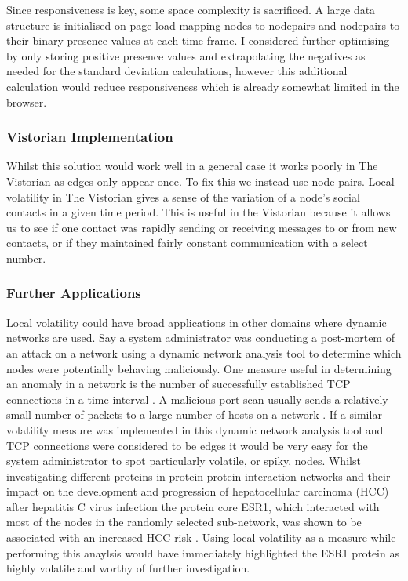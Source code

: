 Since responsiveness is key, some space complexity is sacrificed. A large data structure is initialised on page load mapping nodes to nodepairs and nodepairs to their binary presence values at each time frame.
I considered further optimising by only storing positive presence values and extrapolating the negatives as needed for the standard deviation calculations, however this additional calculation would reduce responsiveness which is already somewhat limited in the browser.

\subsubsection*{Vistorian Implementation}
Whilst this solution would work well in a general case it works poorly in The Vistorian as edges only appear once. To fix this we instead use node-pairs. 
Local volatility in The Vistorian gives a sense of the variation of a node's social contacts in a given time period. This is useful in the Vistorian because it allows us to see if one contact was rapidly sending or receiving messages to or from new contacts, or if they maintained fairly constant communication with a select number. 


\subsubsection*{Further Applications}
Local volatility could have broad applications in other domains where dynamic networks are used. 
\newline\newline
Say a system administrator was conducting a post-mortem of an attack on a network using a dynamic network analysis tool to determine which nodes were potentially behaving maliciously. One measure useful in determining an anomaly in a network is the number of successfully established TCP connections in a time interval \cite{fnpfid}. A malicious port scan usually sends a relatively small number of packets to a large number of hosts on a network \cite{fnpfid}. If a similar volatility measure was implemented in this dynamic network analysis tool and TCP connections were considered to be edges it would be very easy for the system administrator to spot particularly volatile, or spiky, nodes.
\newline\newline
Whilst investigating different proteins in protein-protein interaction networks and their impact on the development and progression of hepatocellular carcinoma (HCC) after hepatitis C virus infection the protein core ESR1, which interacted with most of the nodes in the randomly selected sub-network, was shown to be associated with an increased HCC risk \cite{acaotdbnihih}. Using local volatility as a measure while performing this anaylsis would have immediately highlighted the ESR1 protein as highly volatile and worthy of further investigation.

